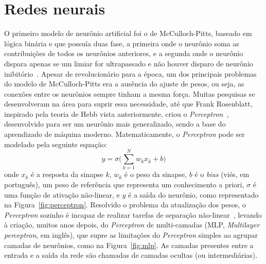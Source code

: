 \section{Redes neurais}\label{sec:redesneurais}
O primeiro modelo de neurônio artificial foi o de McCulloch-Pitts, baseado em lógica binária e que possuía duas fase, a primeira onde o neurônio soma as contribuições de todos os neurônios anteriores, e a segunda onde o neurônio dispara apenas se um limiar for ultrapassado e não houver disparo de neurônio inibitório~\cite{mcculloch_logical_1943}. Apesar de revolucionário para a época, um dos principais problemas do modelo de McCulloch-Pitts era a ausência do ajuste de pesos, ou seja, as conexões entre os neurônios sempre tinham a mesma força. Muitas pesquisas se desenvolveram na área para suprir essa necessidade, até que Frank Rosenblatt, inspirado pela teoria de Hebb vista anteriormente, criou o \textit{Perceptron}~\cite{rosenblatt_perceptron_1958}, desenvolvido para ser um neurônio mais generalizado, sendo a base do aprendizado de máquina moderno. Matematicamente, o \textit{Perceptron} pode ser modelado pela seguinte equação:
\begin{equation}\label{eq:perceptron}
	y=\sigma\Big(\sum_{k=1}^Nw_kx_k+b\Big)
\end{equation}
onde $x_k$ é a resposta da sinapse $k$, $w_k$ é o peso da sinapse, $b$ é o \textit{bias} (viés, em português), um peso de referência que representa um conhecimento a priori, %
$\sigma$ é uma função de ativação não-linear, e $y$ é a saída do neurônio, como representado na Figura~\ref{fig:perceptron}. Resolvido o problema da atualização dos pesos, o \textit{Perceptron} sozinho é incapaz de realizar tarefas de separação não-linear~\cite{minsky_perceptrons_2017}, levando à criação, muitos anos depois, do \textit{Perceptron} de multi-camadas (MLP, \textit{Multilayer perceptron}, em inglês), que supre as limitações do \textit{Perceptron} simples ao agrupar camadas de neurônios, como na Figura~\ref{fig:mlp}. As camadas presentes entre a entrada e a saída da rede são chamadas de camadas ocultas (ou intermediárias).
